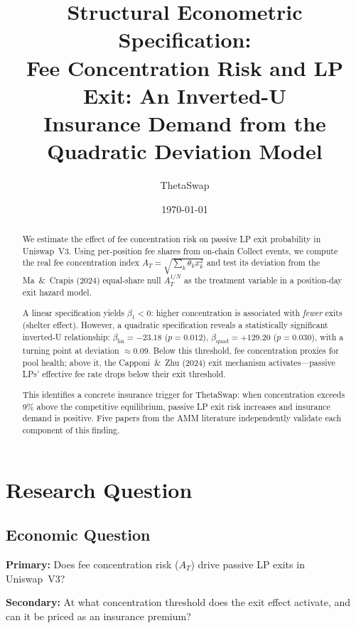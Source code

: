 \documentclass[11pt,a4paper]{article}
\title{Structural Econometric Specification:\\[4pt]
       \large Fee Concentration Risk and LP Exit: An Inverted-U\\[2pt]
       \large Insurance Demand from the Quadratic Deviation Model}
\author{ThetaSwap}
\date{\today}
\begin{document}
\maketitle

\begin{abstract}
We estimate the effect of fee concentration risk on passive LP exit
probability in Uniswap~V3. Using per-position fee shares from on-chain
Collect events, we compute the real fee concentration index
$A_T = \sqrt{\sum_k \theta_k x_k^2}$ and test its deviation from the
Ma~\&~Crapis (2024) equal-share null $A_T^{1/N}$ as the treatment variable
in a position-day exit hazard model.

A linear specification yields $\beta_1 < 0$: higher concentration is
associated with \emph{fewer} exits (shelter effect). However, a quadratic
specification reveals a statistically significant inverted-U relationship:
$\beta_{\mathrm{lin}} = -23.18$ ($p = 0.012$),
$\beta_{\mathrm{quad}} = +129.20$ ($p = 0.030$), with a turning point at
deviation $\approx 0.09$. Below this threshold, fee concentration proxies
for pool health; above it, the Capponi~\&~Zhu (2024) exit mechanism
activates---passive LPs' effective fee rate drops below their exit
threshold.

This identifies a concrete insurance trigger for ThetaSwap: when
concentration exceeds 9\% above the competitive equilibrium, passive LP exit
risk increases and insurance demand is positive. Five papers from the AMM
literature independently validate each component of this finding.
\end{abstract}

\tableofcontents

\section{Research Question}\label{sec:research-question}

\subsection{Economic Question}

\textbf{Primary:} Does fee concentration risk ($A_T$) drive passive LP
exits in Uniswap~V3?

\textbf{Secondary:} At what concentration threshold does the exit effect
activate, and can it be priced as an insurance premium?
\end{document}
